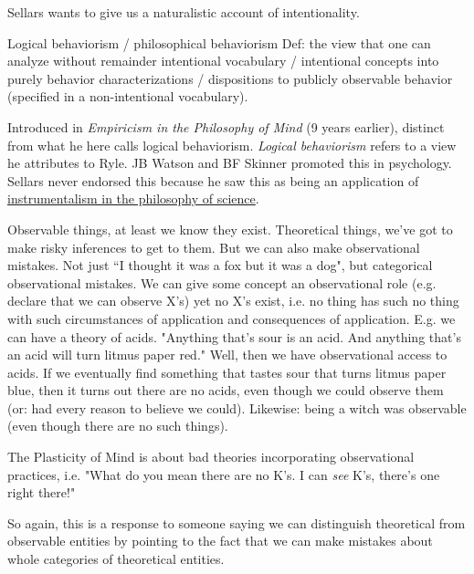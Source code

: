 Sellars wants to give us a naturalistic account of intentionality.

Logical behaviorism / philosophical behaviorism
Def: the view that one can analyze without remainder intentional vocabulary / intentional concepts into purely behavior characterizations / dispositions to publicly observable behavior (specified in a non-intentional vocabulary).

Introduced in \emph{Empiricism in the Philosophy of Mind} (9 years earlier), distinct from what he here calls logical behaviorism. \emph{Logical behaviorism} refers to a view he attributes to Ryle. JB Watson and BF Skinner promoted this in psychology. Sellars never endorsed this because he saw this as being an application of \href{doc/phil/People/Brandom/On Sellars/2009/Lecture03/Instrumentalism}{instrumentalism in the philosophy of science}.

Observable things, at least we know they exist. Theoretical things, we've got to make risky inferences to get to them. But we can also make observational mistakes. Not just ``I thought it was a fox but it was a dog", but categorical observational mistakes. We can give some concept an observational role (e.g. declare that we can observe X's) yet no X's exist, i.e. no thing has such no thing with such circumstances of application and consequences of application. E.g. we can have a theory of acids. "Anything that's sour is an acid. And anything that's an acid will turn litmus paper red." Well, then we have observational access to acids. If we eventually find something that tastes sour that turns litmus paper blue, then it turns out there are no acids, even though we could observe them (or: had every reason to believe we could). Likewise: being a witch was observable (even though there are no such things).

The Plasticity of Mind is about bad theories incorporating observational practices, i.e. "What do you mean there are no K's. I can \emph{see} K's, there's one right there!"

So again, this is a response to someone saying we can distinguish theoretical from observable entities by pointing to the fact that we can make mistakes about whole categories of theoretical entities.


